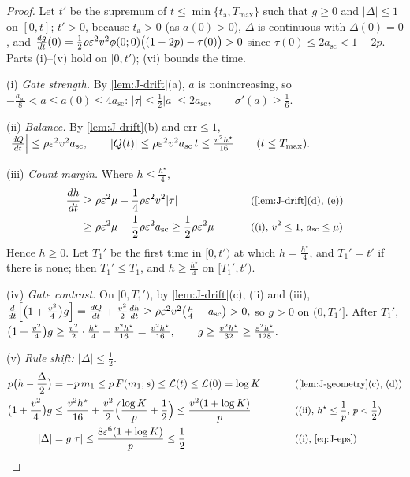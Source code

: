 \begin{proof}
Let $t'$ be the supremum of $t\le\min\{t_{\mathrm a},T_{\max}\}$ such that $g\ge0$ and $|\Delta|\le1$ on $[0,t]$; $t'>0$, because $t_{\mathrm a}>0$ (as $a(0)>0$), $\Delta$ is continuous with $\Delta(0)=0$, and
$\ddt{g}(0)=\frac{1}{2}\rho\initscale^2v^2\phi(0;0)\bigl((1-2p)-\tau(0)\bigr)>0$ since $\tau(0)\le2a_{\mathrm{sc}}<1-2p$. Parts (i)--(v) hold on $[0,t')$; (vi) bounds the time.

\smallskip\noindent(i) \emph{Gate strength.} By \cref{lem:J-drift}(a), $a$ is nonincreasing, so $-\frac{a_{\mathrm{sc}}}{8}<a\le a(0)\le4a_{\mathrm{sc}}$:
 $|\tau|\le\tfrac{1}{2}|a|\le2a_{\mathrm{sc}},\qquad \sigma'(a)\ge\tfrac{1}{6}.$ 

\noindent(ii) \emph{Balance.} By \cref{lem:J-drift}(b) and $\mathrm{err}\le1$,
 $\Bigl|\ddt{Q}\Bigr|\le\rho\initscale^2v^2a_{\mathrm{sc}},\qquad |Q(t)|\le\rho\initscale^2v^2a_{\mathrm{sc}}\,t\le\frac{v^2h^\star}{16}\qquad(t\le T_{\max}).$ 

\noindent(iii) \emph{Count margin.} Where $h\le\frac{h^\star}{4}$,
\begin{alignat*}{2}
 \ddt{h}&\ge\rho\initscale^2\mu-\tfrac{1}{4}\rho\initscale^2v^2|\tau| &\qquad& \why{\cref{lem:J-drift}(d), (e)}\\
 &\ge\rho\initscale^2\mu-\tfrac{1}{2}\rho\initscale^2a_{\mathrm{sc}}\ge\tfrac{1}{2}\rho\initscale^2\mu && \why{(i), $v^2\le1$, $a_{\mathrm{sc}}\le\mu$}
\end{alignat*}
Hence $h\ge0$. Let $T_1'$ be the first time in $[0,t')$ at which $h=\frac{h^\star}{4}$, and $T_1'=t'$ if there is none; then $T_1'\le T_1$, and $h\ge\frac{h^\star}{4}$ on
$[T_1',t')$.

\noindent(iv) \emph{Gate contrast.} On $[0,T_1')$, by \cref{lem:J-drift}(c), (ii) and (iii),
 $\frac{d}{dt}\Bigl[\bigl(1+\tfrac{v^2}{4}\bigr)g\Bigr]=\ddt{Q}+\frac{v^2}{2}\ddt{h}\ge\rho\initscale^2v^2\bigl(\tfrac{\mu}{4}-a_{\mathrm{sc}}\bigr)>0,$ 
so $g>0$ on $(0,T_1']$. After $T_1'$,
 $\bigl(1+\tfrac{v^2}{4}\bigr)g\ge\frac{v^2}{2}\cdot\frac{h^\star}{4}-\frac{v^2h^\star}{16}=\frac{v^2h^\star}{16},\qquad g\ge\frac{v^2h^\star}{32}\ge\frac{\initscale^2h^\star}{128} .$ 

\noindent(v) \emph{Rule shift: $|\Delta|\le\frac{1}{2}$.}
\begin{alignat*}{2}
 p\bigl(h-\tfrac{\Delta}{2}\bigr)&=-p\,m_1\le p\,F(m_1;s)\le\mathcal L(t)\le\mathcal L(0)=\log K &\qquad& \why{\cref{lem:J-geometry}(c), (d)}\\
 \bigl(1+\tfrac{v^2}{4}\bigr)g&\le\frac{v^2h^\star}{16}+\frac{v^2}{2}\Bigl(\frac{\log K}{p}+\frac{1}{2}\Bigr)\le\frac{v^2(1+\log K)}{p} && \why{(ii), $h^\star\le\tfrac{1}{p}$, $p<\tfrac{1}{2}$}\\
 |\Delta|&=g|\tau|\le\frac{8\initscale^6(1+\log K)}{p}\le\frac{1}{2} && \why{(i), \cref{eq:J-eps}}
\end{alignat*}


\end{proof}
